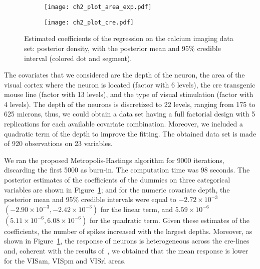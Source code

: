 \begin{figure}[t]
	\centering
	\begin{subfigure}{\linewidth} \centering
		\texttt{[image: ch2\_plot\_area\_exp.pdf]}
	\end{subfigure}
	\begin{subfigure}{\linewidth} \centering
		\texttt{[image: ch2\_plot\_cre.pdf]}   \end{subfigure}
	\caption[Estimated coefficients of the regression on the calcium imaging data set.]{Estimated coefficients of the regression on the calcium imaging data set: posterior density, with the posterior mean and 95\% credible interval (colored dot and segment).} \label{fig:calcium_coeff}
\end{figure}


The covariates that we considered are the depth of the neuron, the area of the visual cortex where the neuron is located (factor with 6 levels), the cre transgenic mouse line (factor with 13 levels), and the type of visual stimulation (factor with 4 levels). 
The depth of the neurons is discretized to 22 levels, ranging from 175 to 625 microns, thus, we could obtain a data set having a full factorial design with 5 replications for each available covariate combination. Moreover, we included a quadratic term of the depth to improve the fitting. The obtained data set is made of 920 observations on 23 variables.


We ran the proposed Metropolis-Hastings algorithm for 9000 iterations, discarding the first 5000 as burn-in. The computation time was 98 seconds.
The posterior estimates of the coefficients of the dummies on three categorical variables are shown in Figure~\ref{fig:calcium_coeff}; and for the numeric covariate depth, the posterior mean and 95\% credible intervals were equal to $-2.72\times 10^{-3}$ $(-2.90\times 10^{-3}, -2.42\times 10^{-3})$ for the linear term, and $5.59\times 10^{-6}$ $(5.11\times 10^{-6}, 6.08\times 10^{-6})$ for the quadratic term.
Given these estimates of the coefficients, the number of spikes increased with the largest depths.
Moreover, as shown in Figure~\ref{fig:calcium_coeff}, the response of neurons is heterogeneous across the cre-lines and, coherent with the results of~\citet{vries2020}, we obtained that the mean response is lower for the VISam, VISpm and VISrl areas.

